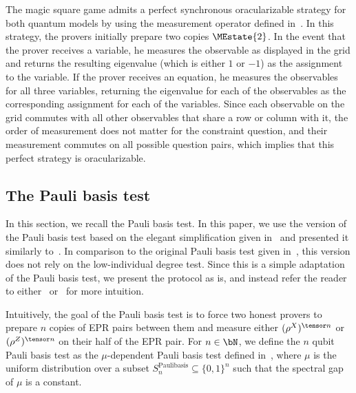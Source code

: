 The magic square game admits a perfect synchronous oracularizable strategy for both quantum models by using the measurement operator defined in~. In this strategy, the provers initially prepare two copies $\MEstate{2}$. In the event that the prover receives a variable, he measures the observable as displayed in the grid and returns the resulting eigenvalue (which is either $1$ or $-1$) as the assignment to the variable. If the prover receives an equation, he measures the observables for all three variables, returning the eigenvalue for each of the observables as the corresponding assignment for each of the variables. Since each observable on the grid commutes with all other observables that share a row or column with it, the order of measurement does not matter for the constraint question, and their measurement commutes on all possible question pairs, which implies that this perfect strategy is oracularizable. 


\subsection{The Pauli basis test} \label{sec:Paulibasis}

In this section, we recall the Pauli basis test. In this paper, we use the version of the Pauli basis test based on the elegant simplification given in~\cite{delasalleSpectralGapStability2022} and presented it similarly to~\cite[Section 6]{linTracialEmbeddableStrategies2024}. In comparison to the original Pauli basis test given in~\cite[Section 7]{jiMIPRE2022a}, this version does not rely on the low-individual degree test. Since this is a simple adaptation of the Pauli basis test, we present the protocol as is, and instead refer the reader to either~\cite{delasalleSpectralGapStability2022} or~\cite[Section 6]{linTracialEmbeddableStrategies2024} for more intuition.

Intuitively, the goal of the Pauli basis test is to force two honest provers to prepare $n$ copies of EPR pairs between them and measure either $(\rho^X)^{\tensor n}$ or $(\rho^Z)^{\tensor n}$ on their half of the EPR pair. For $n \in \bN$, we define the $n$ qubit Pauli basis test as the $\mu$-dependent Pauli basis test defined in~\cite[Section 6.3]{linTracialEmbeddableStrategies2024}, where $\mu$ is the uniform distribution over a subset $S^{\text{Paulibasis}}_n \subseteq \{0,1\}^n$ such that the spectral gap of $\mu$ is a constant.

